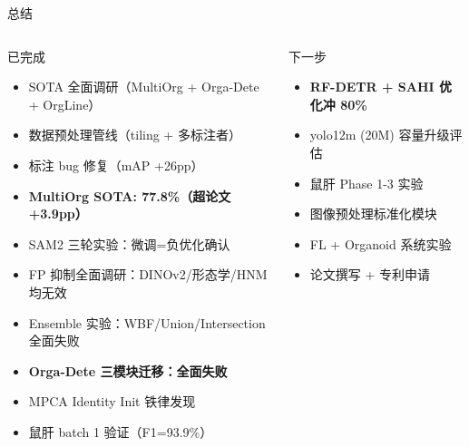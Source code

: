 \documentclass[aspectratio=169, 10pt]{beamer}
\begin{document}
\begin{frame}{总结}
  \begin{columns}[T]
    \begin{block}{已完成}
      \begin{itemize}
        \item[\checkmark] SOTA 全面调研（MultiOrg + Orga-Dete + OrgLine）
        \item[\checkmark] 数据预处理管线（tiling + 多标注者）
        \item[\checkmark] 标注 bug 修复（mAP +26pp）
        \item[\checkmark] \textbf{MultiOrg SOTA: 77.8\%（超论文 +3.9pp）}
        \item[\checkmark] SAM2 三轮实验：微调=负优化确认
        \item[\checkmark] FP 抑制全面调研：DINOv2/形态学/HNM 均无效
        \item[\checkmark] Ensemble 实验：WBF/Union/Intersection 全面失败
        \item[\checkmark] \textbf{Orga-Dete 三模块迁移：全面失败}
        \item[\checkmark] MPCA Identity Init 铁律发现
        \item[\checkmark] 鼠肝 batch 1 验证（F1=93.9\%）
      \end{itemize}
    \end{block}
    \begin{block}{下一步}
      \begin{itemize}
        \item[$\rightarrow$] \textbf{RF-DETR + SAHI 优化冲 80\%}
        \item[$\rightarrow$] yolo12m (20M) 容量升级评估
        \item[$\circ$] 鼠肝 Phase 1-3 实验
        \item[$\circ$] 图像预处理标准化模块
        \item[$\circ$] FL + Organoid 系统实验
        \item[$\circ$] 论文撰写 + 专利申请
      \end{itemize}
    \end{block}
  \end{columns}
\end{frame}
\end{document}
